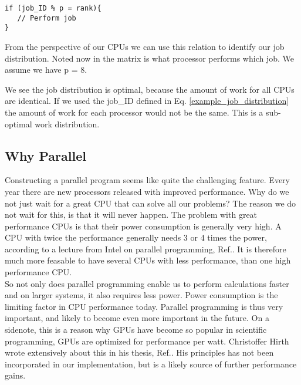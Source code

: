 \begin{lstlisting}
if (job_ID % p = rank){
   // Perform job
}
\end{lstlisting}
From the perspective of our CPUs we can use this relation to identify our job distribution. Noted now in the matrix is what processor performs which job. We assume we have p = 8.

\begin{center}
\end{center}
We see the job distribution is optimal, because the amount of work for all CPUs are identical. If we used the job\_ID defined in Eq. \eqref{example_job_distribution} the amount of work for each processor would not be the same. This is a sub-optimal work distribution. 

\subsection{Why Parallel}
Constructing a parallel program seems like quite the challenging feature. Every year there are new processors released with improved performance. Why do we not just wait for a great CPU that can solve all our problems? The reason we do not wait for this, is that it will never happen. The problem with great performance CPUs is that their power consumption is generally very high. A CPU with twice the performance generally needs 3 or 4 times the power, according to a lecture from Intel on parallel programming, Ref.\cite{intelduden_citeation}. It is therefore much more feasable to have several CPUs with less performance, than one high performance CPU. \\

So not only does parallel programming enable us to perform calculations faster and on larger systems, it also requires less power. Power consumption is the limiting factor in CPU performance today. Parallel programming is thus very important, and likely to become even more important in the future. On a sidenote, this is a reason why GPUs have become so popular in scientific programming, GPUs are optimized for performance per watt. Christoffer Hirth wrote extensively about this in his thesis, Ref.\cite{non_refer_numba1}. His principles has not been incorporated in our implementation, but is a likely source of further performance gains.

